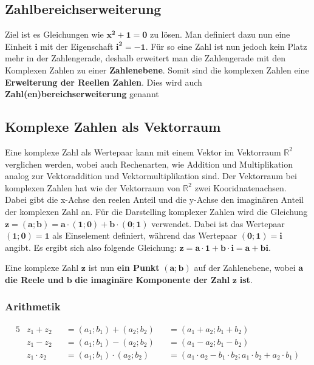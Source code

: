 \subsection{Zahlbereichserweiterung}

\parbox{0.9\textwidth}{
    Ziel ist es Gleichungen wie $\mathbf{x^2 + 1 = 0}$ zu lösen.
    Man definiert dazu nun eine Einheit $\mathbf{i}$ mit der Eigenschaft $\mathbf{i^2 = -1}$.
    Für so eine Zahl ist nun jedoch kein Platz mehr in der Zahlengerade, 
    deshalb erweitert man die Zahlengerade mit den Komplexen Zahlen zu einer \textbf{Zahlenebene}.
    Somit sind die komplexen Zahlen eine \textbf{Erweiterung der Reellen Zahlen}.
    Dies wird auch \textbf{Zahl(en)bereichserweiterung} genannt
} 

\subsection{Komplexe Zahlen als Vektorraum}

\parbox{0.9\textwidth}
{
    Eine komplexe Zahl als Wertepaar kann mit einem Vektor im Vektorraum $\mathbb{R}^2$ verglichen werden,
    wobei auch Rechenarten, wie Addition und Multiplikation analog zur Vektoraddition und Vektormultiplikation sind.
    Der Vektorraum bei komplexen Zahlen hat wie der Vektorraum von $\mathbb{R}^2$ zwei Kooridnatenachsen.
    Dabei gibt die x-Achse den reelen Anteil und die y-Achse den imaginären Anteil der komplexen Zahl an.
    Für die Darstelling komplexer Zahlen wird die Gleichung 
    $\mathbf{z = \left(a; b\right) = a \cdot \left(1; 0\right) + b \cdot \left(0;1\right)}$ verwendet.
    Dabei ist das Wertepaar $\mathbf{\left(1; 0\right) = 1}$ als Einselement definiert, während das Wertepaar 
    $\mathbf{\left(0; 1\right) = i}$ angibt. Es ergibt sich also folgende Gleichung: 
    $\mathbf{z = a \cdot 1 + b \cdot i = a + bi}$.

    Eine komplexe Zahl $\mathbf{z}$ ist nun \textbf{ein Punkt} $\mathbf{\left(a;b\right)}$ auf der Zahlenebene,
    wobei $\mathbf{a}$ \textbf{die Reele und} $\mathbf{b}$ \textbf{die imaginäre Komponente der Zahl} $\mathbf{z}$ \textbf{ist}.
}

\subsubsection{Arithmetik}

\begin{alignat*}{5}
    &z_1 + z_2     &&= \left(a_1; b_1\right) + \left(a_2; b_2\right)     &&= \left(a_1 + a_2; b_1 + b_2\right) \\
    &z_1 - z_2     &&= \left(a_1; b_1\right) - \left(a_2; b_2\right)     &&= \left(a_1 - a_2; b_1 - b_2\right) \\
    &z_1 \cdot z_2 &&= \left(a_1; b_1\right) \cdot \left(a_2; b_2\right) &&= \left(a_1 \cdot a_2 - b_1 \cdot b_2; a_1 \cdot b_2 + a_2 \cdot b_1\right)
\end{alignat*}

